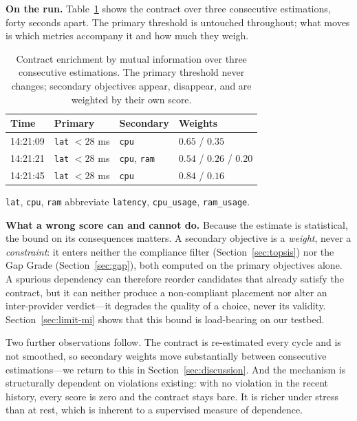 \documentclass[conference]{IEEEtran}
\begin{document}
\textbf{On the run.} Table~\ref{tab:mi} shows the contract over three
consecutive estimations, forty seconds apart. The primary threshold is
untouched throughout; what moves is which metrics accompany it and how much
they weigh.

\begin{table}[t]
\centering
\caption{Contract enrichment by mutual information over three consecutive
estimations. The primary threshold never changes; secondary objectives appear,
disappear, and are weighted by their own score.}
\label{tab:mi}
\scriptsize
\setlength{\tabcolsep}{4pt}
\begin{tabular}{@{}llll@{}}
\toprule
\textbf{Time} & \textbf{Primary} & \textbf{Secondary} & \textbf{Weights}\\
\midrule
14:21:09 & \texttt{lat} $<28$ ms & \texttt{cpu} & $0.65$ / $0.35$\\
14:21:21 & \texttt{lat} $<28$ ms & \texttt{cpu}, \texttt{ram}
         & $0.54$ / $0.26$ / $0.20$\\
14:21:45 & \texttt{lat} $<28$ ms & \texttt{cpu} & $0.84$ / $0.16$\\
\bottomrule
\end{tabular}

\vspace{2pt}
{\scriptsize \texttt{lat}, \texttt{cpu}, \texttt{ram} abbreviate
\texttt{latency}, \texttt{cpu\_usage}, \texttt{ram\_usage}.}
\end{table}

\textbf{What a wrong score can and cannot do.} Because the estimate is
statistical, the bound on its consequences matters. A secondary objective is
a \emph{weight}, never a \emph{constraint}: it enters neither the compliance
filter (Section~\ref{sec:topsis}) nor the Gap Grade
(Section~\ref{sec:gap}), both computed on the primary objectives alone. A
spurious dependency can therefore reorder candidates that already satisfy the
contract, but it can neither produce a non-compliant placement nor alter an
inter-provider verdict---it degrades the quality of a choice, never its
validity. Section~\ref{sec:limit-mi} shows that this bound is load-bearing on
our testbed.

Two further observations follow. The contract is re-estimated every cycle and
is not smoothed, so secondary weights move substantially between consecutive
estimations---we return to this in Section~\ref{sec:discussion}. And the
mechanism is structurally dependent on violations existing: with no violation
in the recent history, every score is zero and the contract stays bare. It is
richer under stress than at rest, which is inherent to a supervised measure of
dependence.
\end{document}
